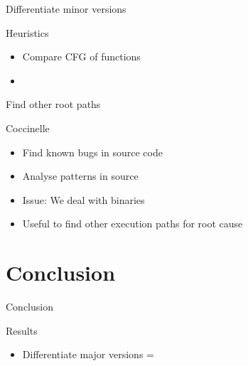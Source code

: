\documentclass[11pt]{beamer}
\begin{document}
\begin{frame}

\end{frame}


\begin{frame}{Differentiate minor versions}

\begin{block}{Heuristics}
	\begin{itemize}
		\item Compare CFG of functions
		\item 
	\end{itemize}
\end{block}

\end{frame}


\begin{frame}{Find other root paths}
\begin{block}{Coccinelle}
	\begin{itemize}
		\item Find known bugs in source code
		\item Analyse patterns in source
		\item Issue: We deal with binaries
		\item Useful to find other execution paths for root cause
	\end{itemize}
\end{block}
\end{frame}

\section{Conclusion}
\begin{frame}{Conclusion}
	\begin{block}{Results}
		\begin{itemize}
			\item Differentiate major versions =
		\end{itemize}
		
	\end{block}
\end{frame}
\end{document}
